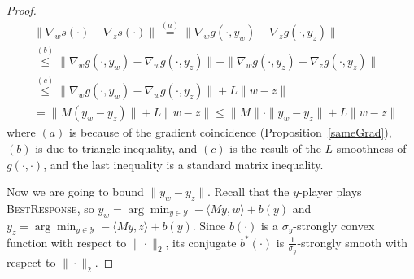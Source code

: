 \documentclass[final,12pt]{colt2018} %
\def\BR{\textsc{BestResponse}\xspace}
\newcommand{\yx}[1]{y_{#1}}
\newcommand{\YY}{\mathcal{Y}}
\begin{document}
\begin{proof}

\begin{equation} \label{aux:h}
\begin{aligned}
& \| \nabla_w s(\cdot) - \nabla_z s(\cdot )\| 
\overset{(a)}{=} \|  \nabla_w g( \cdot, \yx{w}) - \nabla_z g( \cdot, \yx{z})  \| 
\\ & \overset{(b)}{\leq}
\|  \nabla_w g( \cdot, \yx{w}) - \nabla_w g( \cdot, \yx{z})  \| 
+ 
\|  \nabla_w g( \cdot, \yx{z}) - \nabla_z g( \cdot, \yx{z})  \|  
\\ & \overset{(c)}{\leq}
\|  \nabla_w g( \cdot, \yx{w}) - \nabla_w g( \cdot, \yx{z})  \| 
+ 
L \| w - z \| 
\\ & =
 \| M( \yx{w}  - \yx{z} ) \| 
+ 
L \| w - z \|
\leq \| M \|\cdot \| \yx{w}  - \yx{z}  \| + L \| w - z \|
\end{aligned}
\end{equation}
where $(a)$ is because of the gradient coincidence (Proposition~\ref{sameGrad}),
$(b)$ is due to triangle inequality, and $(c)$ is the result of the $L$-smoothness of $g(\cdot,\cdot)$,
and the last inequality is a standard matrix inequality.

Now we are going to bound 
$ \| \yx{w} - \yx{z} \|.$ 
Recall that the $y$-player plays \BR, so
$\yx{w} = \arg\min_{y \in \YY} - \langle M y, w \rangle + b(y)$ 
and $\yx{z} = \arg\min_{y \in \YY} - \langle M y, z \rangle + b(y)$.
Since $b(\cdot)$ is a $\sigma_{y}$-strongly convex function with respect to $\| \cdot\|_{2}$,
its conjugate $b^{*}(\cdot)$ is $\frac{1}{\sigma_y}$-strongly smooth with respect to $\| \cdot \|_{2}$.


\end{proof}
\end{document}
